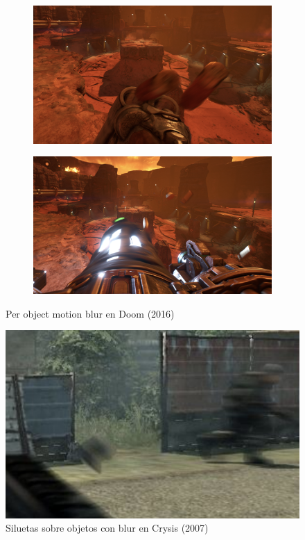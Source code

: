 \documentclass[withindex, glossary]{cam-thesis}
\begin{document}
\begin{figure}[!htbp]
    \centering
    \begin{subfigure}[b]{0.8\textwidth}
        \includegraphics[width=\textwidth]{figures/doomblur1.png}
    \end{subfigure}
    \centering
    \begin{subfigure}[b]{0.8\textwidth}
        \includegraphics[width=\textwidth]{figures/doomblur2.png}
    \end{subfigure}
    \caption{Per object motion blur en Doom (2016)}
    \label{doomblur}
\end{figure}

\begin{figure}[!htbp]
    \includegraphics[width=.8\linewidth]{figures/crysisblur.png}
    \caption{Siluetas sobre objetos con blur en Crysis (2007)\cite{crysis}}
    \label{crysisblur}
\end{figure}
\end{document}
